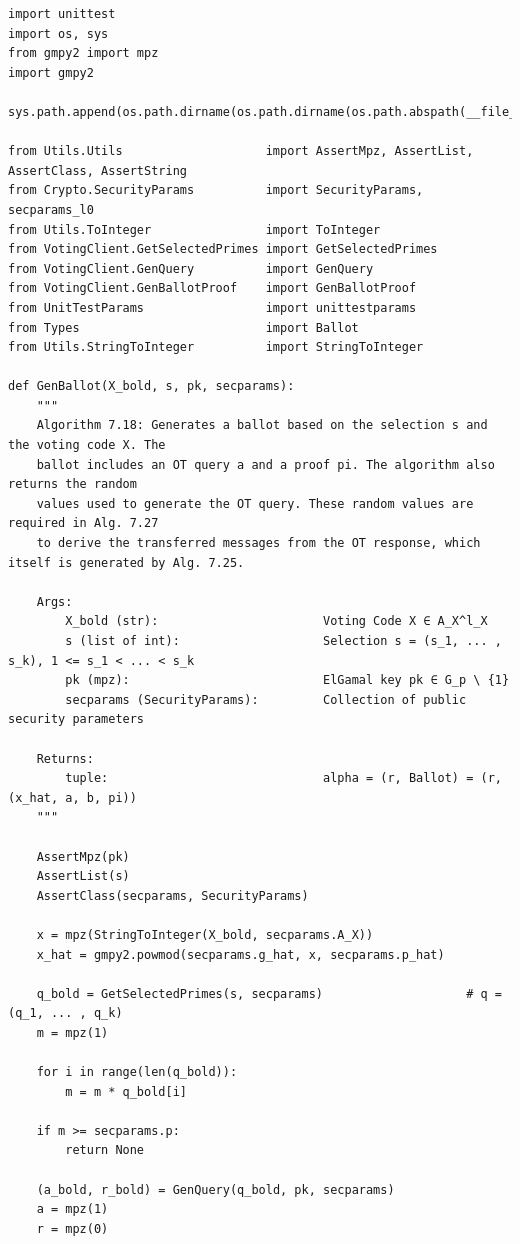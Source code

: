 \begin{verbatim}
import unittest
import os, sys
from gmpy2 import mpz
import gmpy2

sys.path.append(os.path.dirname(os.path.dirname(os.path.abspath(__file__))))

from Utils.Utils                    import AssertMpz, AssertList, AssertClass, AssertString
from Crypto.SecurityParams          import SecurityParams, secparams_l0
from Utils.ToInteger                import ToInteger
from VotingClient.GetSelectedPrimes import GetSelectedPrimes
from VotingClient.GenQuery          import GenQuery
from VotingClient.GenBallotProof    import GenBallotProof
from UnitTestParams                 import unittestparams
from Types                          import Ballot
from Utils.StringToInteger          import StringToInteger

def GenBallot(X_bold, s, pk, secparams):
    """
    Algorithm 7.18: Generates a ballot based on the selection s and the voting code X. The
    ballot includes an OT query a and a proof pi. The algorithm also returns the random
    values used to generate the OT query. These random values are required in Alg. 7.27
    to derive the transferred messages from the OT response, which itself is generated by Alg. 7.25.

    Args:
        X_bold (str):                       Voting Code X ∈ A_X^l_X
        s (list of int):                    Selection s = (s_1, ... , s_k), 1 <= s_1 < ... < s_k
        pk (mpz):                           ElGamal key pk ∈ G_p \ {1}
        secparams (SecurityParams):         Collection of public security parameters

    Returns:
        tuple:                              alpha = (r, Ballot) = (r, (x_hat, a, b, pi))
    """

    AssertMpz(pk)
    AssertList(s)
    AssertClass(secparams, SecurityParams)

    x = mpz(StringToInteger(X_bold, secparams.A_X))
    x_hat = gmpy2.powmod(secparams.g_hat, x, secparams.p_hat)

    q_bold = GetSelectedPrimes(s, secparams)                    # q = (q_1, ... , q_k)
    m = mpz(1)

    for i in range(len(q_bold)):
        m = m * q_bold[i]

    if m >= secparams.p:
        return None

    (a_bold, r_bold) = GenQuery(q_bold, pk, secparams)
    a = mpz(1)
    r = mpz(0)


\end{verbatim}

